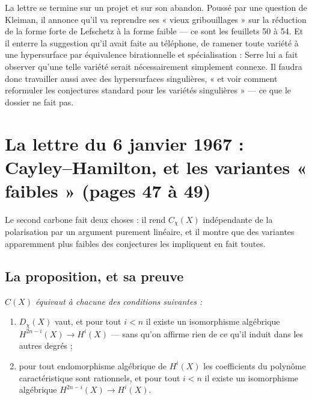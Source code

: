 \documentclass[11pt,a4paper]{article}
\begin{document}
La lettre se termine sur un projet et sur son abandon. Poussé par une question
de Kleiman, il annonce qu'il va reprendre ses « vieux gribouillages » sur la
réduction de la forme forte de Lefschetz à la forme faible --- ce sont les
feuillets 50 à 54. Et il enterre la suggestion qu'il avait faite au téléphone,
de ramener toute variété à une hypersurface par équivalence birationnelle et
spécialisation : Serre lui a fait observer qu'une telle variété serait
nécessairement simplement connexe. Il faudra donc travailler aussi avec des
hypersurfaces singulières, « et voir comment reformuler les conjectures
standard pour les variétés singulières » --- ce que le dossier ne fait pas.

\section*{La lettre du 6 janvier 1967 : Cayley--Hamilton, et les variantes « faibles » (pages 47 à 49)}

Le second carbone fait deux choses : il rend $C_{\chi}(X)$ indépendante de la
polarisation par un argument purement linéaire, et il montre que des variantes
apparemment plus faibles des conjectures les impliquent en fait toutes.

\subsection*{La proposition, et sa preuve}

\emph{$C(X)$ équivaut à chacune des conditions suivantes :}

\begin{enumerate}
  \item[a)] $D_{\chi}(X)$ vaut, et pour tout $i < n$ il existe un isomorphisme
  algébrique $H^{2n-i}(X) \to H^{i}(X)$ --- sans qu'on affirme rien de ce qu'il
  induit dans les autres degrés ;
  \item[b)] pour tout endomorphisme algébrique de $H^{i}(X)$ les coefficients
  du polynôme caractéristique sont rationnels, et pour tout $i < n$ il existe
  un isomorphisme algébrique $H^{2n-i}(X) \to H^{i}(X)$.
\end{enumerate}
\end{document}
